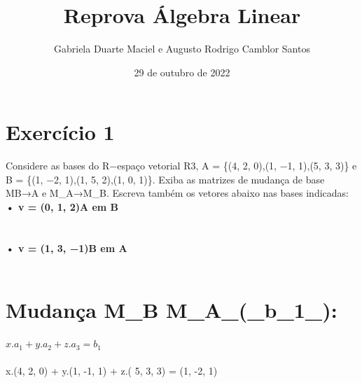 \documentclass{article}
\title{Reprova Álgebra Linear}
\author{Gabriela Duarte Maciel e Augusto Rodrigo Camblor Santos }
\date{29 de outubro de 2022}
\begin{document}
\maketitle

\section{Exercício 1}\label{ex1}
Considere as bases do R−espaço vetorial R3, A = \{(4, 2, 0),(1, −1, 1),(5, 3, 3)\}  e
B = \{(1, −2, 1),(1, 5, 2),(1, 0, 1)\}. Exiba as matrizes de mudança de base MB→A e M_A→M_B. Escreva também os
vetores abaixo nas bases indicadas:
\\\textbf{• v = (0, 1, 2)A em B\\\\}
\\\textbf{• v = (1, 3, −1)B em A\\\\}
\section{Mudança M_B \rightarrow M_A_(_b_1_):}
\textbf{$x. a_1 + y. a_2 + z. a_3 = b_1 $\\\\}
x.(4, 2, 0) + y.(1, -1, 1) + z.( 5, 3, 3) = (1, -2, 1) \\\\
\end{document}

